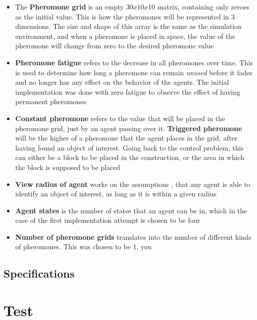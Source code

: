 \begin{itemize}
\item{The \textbf{Pheromone grid} is an empty $30x10x10$ matrix, containing only zeroes as the initial value. This is how the pheromones will be represented in 3 dimensions. The size and shape of this array is the same as the simulation environment, and when a pheromone is placed in space, the value of the pheromone will change from zero to the desired pheromone value}
\item{\textbf{Pheromone fatigue} refers to the decrease in all pheromones over time. This is used to determine how long a pheromone can remain \textit{unused} before it fades and no longer has any effect on the behavior of the agents. The initial implementation was done with zero fatigue to observe the effect of having permanent pheromones}
\item{\textbf{Constant pheromone} refers to the value that will be placed in the pheromone grid, just by an agent passing over it. \textbf{Triggered pheromone} will be the higher of a pheromone that the agent places in the grid, after having found an object of interest. Going back to the control problem, this can either be a block to be placed in the construction, or the area in which the block is supposed to be placed}
\item{\textbf{View radius of agent} works on the assumptions , that any agent is able to identify an object of interest, as long as it is within a given radius}
\item{\textbf{Agent states} is the number of states that an agent can be in, which in the case of the first implementation attempt is chosen to be four}
\item{\textbf{Number of pheromone grids} translates into the number of different kinds of pheromones. This was chosen to be 1, you}
\end{itemize}

\subsection{Specifications}

\section{Test}
\label{chap:stigmergy_test}

